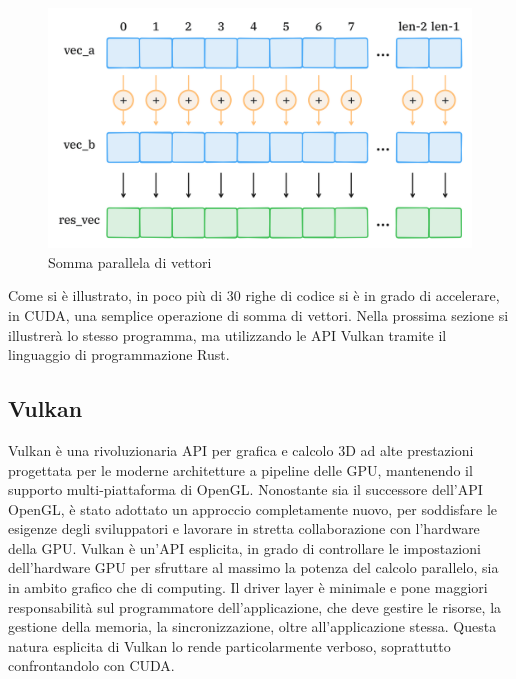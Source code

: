 \begin{figure}[ht]
    \centering
    \includegraphics[width=.9\linewidth]{images/chapter2/sum_vec.png}
    \caption{Somma parallela di vettori}
    \label{fig:sum_vec}
\end{figure}

Come si è illustrato, in poco più di 30 righe di codice si è in grado di accelerare, in CUDA, una semplice operazione di somma di vettori. Nella prossima sezione si illustrerà lo stesso programma, ma utilizzando le API Vulkan tramite il linguaggio di programmazione Rust.

\subsection[Vulkan]{Vulkan}

Vulkan è una rivoluzionaria API per grafica e calcolo 3D ad alte prestazioni progettata per le moderne architetture a pipeline delle GPU, mantenendo il supporto multi-piattaforma di OpenGL. Nonostante sia il successore dell'API OpenGL, è stato adottato un approccio completamente nuovo, per soddisfare le esigenze degli sviluppatori e lavorare in stretta collaborazione con l'hardware della GPU. Vulkan è un'API esplicita, in grado di controllare le impostazioni dell'hardware GPU per sfruttare al massimo la potenza del calcolo parallelo, sia in ambito grafico che di computing. Il driver layer è minimale e pone maggiori responsabilità sul programmatore dell'applicazione, che deve gestire le risorse, la gestione della memoria, la sincronizzazione, oltre all'applicazione stessa. Questa natura esplicita di Vulkan lo rende particolarmente verboso, soprattutto confrontandolo con CUDA.

